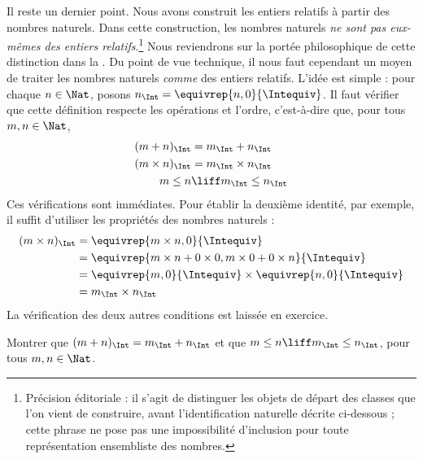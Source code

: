 \documentclass[11pt,a4paper,openany]{memoir}
\begin{document}
Il reste un dernier point. Nous avons construit les entiers relatifs à partir
des nombres naturels. Dans cette construction, les nombres naturels
\emph{ne sont pas eux-mêmes des entiers relatifs}.\footnote{Précision éditoriale : il s'agit de distinguer les objets de départ des classes que l'on vient de construire, avant l'identification naturelle décrite ci-dessous ; cette phrase ne pose pas une impossibilité d'inclusion pour toute représentation ensembliste des nombres.}
Nous reviendrons sur la portée philosophique de cette distinction dans la
. Du point de vue technique, il nous faut cependant un moyen
de traiter les nombres naturels \emph{comme} des entiers relatifs. L'idée
est simple : pour chaque $n \in \Nat$, posons
$n_\Int = \equivrep{n, 0}{\Intequiv}$. Il faut vérifier que cette définition
respecte les opérations et l'ordre, c'est-à-dire que, pour tous $m, n \in \Nat$,
\begin{align*}
	(m + n)_\Int &= m_\Int + n_\Int\\
	(m \times n)_\Int &= m_\Int \times n_\Int\\
	m \leq n &\liff m_\Int \leq n_\Int
\end{align*}
Ces vérifications sont immédiates. Pour établir la deuxième identité,
par exemple, il suffit d'utiliser les propriétés des nombres naturels :
	\begin{align*}
		(m \times n)_\Int  &= \equivrep{m \times n, 0}{\Intequiv} \\
		&= \equivrep{m \times n + 0 \times 0, m \times 0 + 0 \times n}{\Intequiv} \\
		&= \equivrep{m, 0}{\Intequiv} \times \equivrep{n, 0}{\Intequiv} \\
		&= m_\Int \times n_\Int
	\end{align*}
La vérification des deux autres conditions est laissée en exercice.
\begin{prob}
	Montrer que $(m + n)_\Int = m_\Int + n_\Int$ et que $m \leq n \liff m_\Int \leq n_\Int$, pour tous $m, n \in \Nat$.
\end{prob}

\endgroup
\end{document}

